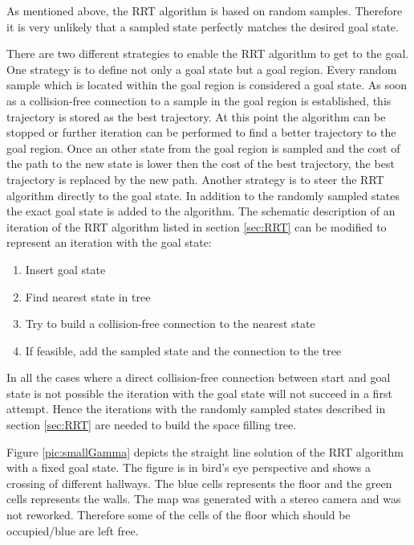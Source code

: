 As mentioned above, the RRT algorithm is based on random samples. Therefore it is very unlikely that a sampled state perfectly matches the desired goal state. \newline

There are two different strategies to enable the RRT algorithm to get to the goal. One strategy is to define not only a goal state but a goal region. Every random sample which is located within the goal region is considered a goal state. As soon as a collision-free connection to a sample in the goal region is established, this trajectory is stored as the best trajectory. At this point the algorithm can be stopped or further iteration can be performed to find a better trajectory to the goal region. Once an other state from the goal region is sampled and the cost of the path to the new state is lower then the cost of the best trajectory, the best trajectory is replaced by the new path. \newline
Another strategy is to steer the RRT algorithm directly to the goal state. In addition to the randomly sampled states the exact goal state is added to the algorithm. The schematic description of an iteration of the RRT algorithm listed in section \ref{sec:RRT} can be modified to represent an iteration with the goal state:

\begin{enumerate}
  \item Insert goal state
  \item Find nearest state in tree
  \item Try to build a collision-free connection to the nearest state
  \item If feasible, add the sampled state and the connection to the tree
\end{enumerate}

In all the cases where a direct collision-free connection between start and goal state is not possible the iteration with the goal state will not succeed in a first attempt. Hence the iterations with the randomly sampled states described in section \ref{sec:RRT} are needed to build the space filling tree.\newline

Figure \ref{pic:smallGamma} depicts the straight line solution of the RRT algorithm with a fixed goal state. The figure is in bird's eye perspective and shows a crossing of different hallways. The blue cells represents the floor and the green cells represents the walls. The map was generated with a stereo camera and was not reworked. Therefore some of the cells of the floor which should be occupied/blue are left free. 

